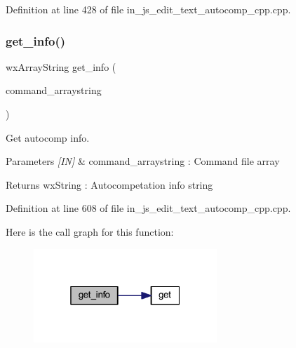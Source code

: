 Definition at line 428 of file in\+\_\+js\+\_\+edit\+\_\+text\+\_\+autocomp\+\_\+cpp.\+cpp.

\mbox{\label{group___edit__text__autocompetation_ga680445f3d07576260ad38580846d5c58}} 
\subsubsection{get\_info()}
{\footnotesize\ttfamily wx\+Array\+String get\+\_\+info (\begin{DoxyParamCaption}\item[{wx\+Array\+String}]{command\+\_\+arraystring }\end{DoxyParamCaption})}



Get autocomp info. 


\begin{DoxyParams}{Parameters}
{\em \mbox{[}\+I\+N\mbox{]}} & command\+\_\+arraystring \+: Command file array \\
\hline
\end{DoxyParams}
\begin{DoxyReturn}{Returns}
wx\+String \+: Autocompetation info string 
\end{DoxyReturn}


Definition at line 608 of file in\+\_\+js\+\_\+edit\+\_\+text\+\_\+autocomp\+\_\+cpp.\+cpp.

Here is the call graph for this function\+:
\nopagebreak
\begin{figure}[H]
\begin{center}
\leavevmode
\includegraphics[width=196pt]{group___edit__text__autocompetation_ga680445f3d07576260ad38580846d5c58_cgraph}
\end{center}
\end{figure}
\mbox{\label{group___edit__text__autocompetation_ga90cad5423e4758c807f93093ec2ca4fa}} 
